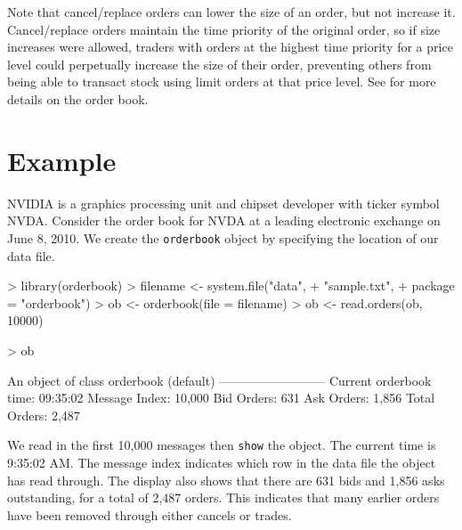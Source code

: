 Note that cancel/replace orders can lower the size of an order, but
not increase it. Cancel/replace orders maintain the time priority of
the original order, so if size increases were allowed, traders with
orders at the highest time priority for a price level could
perpetually increase the size of their order, preventing others from
being able to transact stock using limit orders at that price
level. See \cite{johnson:barry} for more details on the order book.

\section{Example}

NVIDIA is a graphics processing unit and chipset developer with ticker
symbol NVDA. Consider the order book for NVDA at a leading electronic
exchange on June 8, 2010. We create the \texttt{orderbook} object by
specifying the location of our data file.

\begin{Schunk}
\begin{Sinput}
> library(orderbook)
> filename <- system.file("data",
+                         "sample.txt",
+                         package = "orderbook")
> ob <- orderbook(file = filename)
> ob <- read.orders(ob, 10000)
\end{Sinput}
\end{Schunk}
\begin{Schunk}
\begin{Sinput}
> ob
\end{Sinput}
\begin{Soutput}
An object of class orderbook (default)
--------------------------
Current orderbook time:    09:35:02
Message Index:             10,000
Bid Orders:                631
Ask Orders:                1,856
Total Orders:              2,487
\end{Soutput}
\end{Schunk}

We read in the first 10,000 messages then \texttt{show} the object.
The current time is 9:35:02 AM. The message index indicates which row
in the data file the object has read through. The display also shows
that there are 631 bids and 1,856 asks outstanding, for a total of
2,487 orders. This indicates that many earlier orders have been
removed through either cancels or trades.

